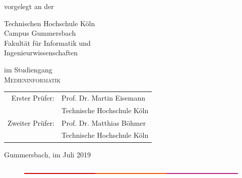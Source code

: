 \begin{titlepage}
\begin{center}
\vspace{1.0cm}



\begin{large}
vorgelegt an der\\ 
\vspace{0.2cm}
\begin{scshape}
Technischen Hochschule Köln\\
Campus Gummersbach\\
Fakultät für Informatik und\\
Ingenieurwissenschaften\\
\end{scshape}
\end{large}

\vspace{0.4cm}

\begin{large}
im Studiengang\\ 
\vspace{0.2cm}
\textsc{Medieninformatik}
\end{large}


\vspace{1.0cm}

\begin{tabular}{rl}
        Erster Prüfer:  &  Prof. Dr. Martin Eisemann\\
       					&  \small Technische Hochschule Köln \\[1.0em]
       Zweiter Prüfer:  &  Prof. Dr. Matthias Böhmer\\
       					&  \small Technische Hochschule Köln\\
\end{tabular}

\vspace{0.8cm}

\begin{large}
Gummersbach, im Juli 2019
\end{large}
\vspace{\distance}
\end{center}
\begin{figure}[!ht]
		\includegraphics[width=\textwidth]{images/balken.png}
\end{figure}


\end{titlepage}
